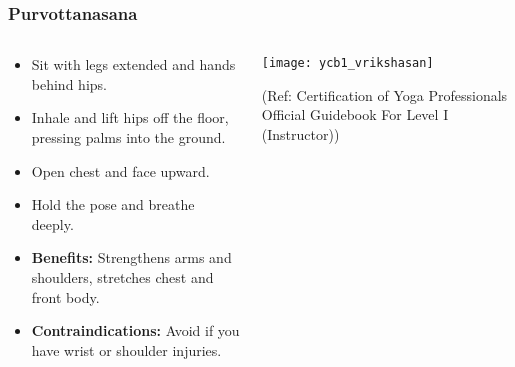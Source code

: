 \begin{frame}[fragile]\frametitle{Purvottanasana}
\begin{columns}
    \begin{column}[T]{0.5\linewidth}
      \begin{itemize}
        \item Sit with legs extended and hands behind hips.
        \item Inhale and lift hips off the floor, pressing palms into the ground.
        \item Open chest and face upward.
        \item Hold the pose and breathe deeply.
        \item \textbf{Benefits:} Strengthens arms and shoulders, stretches chest and front body.
        \item \textbf{Contraindications:} Avoid if you have wrist or shoulder injuries.
      \end{itemize}
    \end{column}
    \begin{column}[T]{0.5\linewidth}
        \begin{center}
        \begin{center}
		        \texttt{[image: ycb1\_vrikshasan]}
				
				{\tiny (Ref: Certification  of Yoga Professionals Official Guidebook For Level I (Instructor))}	        
		\end{center}   
        \end{center}    
    \end{column}
  \end{columns}
\end{frame}

